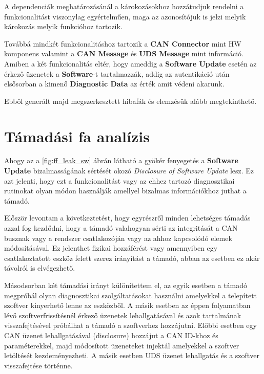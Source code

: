 A dependenciák meghatározásánál a károkozásokhoz hozzátudjuk rendelni a funkcionalitást viszonylag egyértelműen, maga az azonosítójuk is jelzi melyik károkozás melyik funkcióhoz tartozik.

Továbbá mindkét funkcionalitáshoz tartozik a \textbf{CAN Connector} mint HW komponens valamint a \textbf{CAN Message} és \textbf{UDS Message} mint információ. Amiben a két funkcionalitás eltér, hogy ameddig a \textbf{Software Update} esetén az érkező üzenetek a \textbf{Software}-t tartalmazzák, addig az autentikáció után elsősorban a kimenő \textbf{Diagnostic Data} az érték amit védeni akarunk.

Ebből generált majd megszerkesztett hibafák és elemzésük alább megtekinthető. \\

\section{Támadási fa analízis}

Ahogy az a \ref{fig:ff_leak_sw} ábrán látható a gyökér fenyegetés a \textbf{Software Update} bizalmasságának sértését okozó \textit{Disclosure of Software Update} lesz. Ez azt jelenti, hogy ezt a funkcionalitást vagy az ehhez tartozó diagnosztikai rutinokat olyan módon használják amellyel bizalmas információkhoz juthat a támadó.

Először levontam a következtetést, hogy egyrészről minden lehetséges támadás azzal fog kezdődni, hogy a támadó valahogyan sérti az integritását a CAN busznak vagy a rendszer csatlakozóján vagy az ahhoz kapcsolódó elemek módosításával. Ez jelenthet fizikai hozzáférést vagy amennyiben egy csatlakoztatott eszköz felett szerez irányítást a támadó, abban az esetben ez akár távolról is elvégezhető.

Másodsorban két támadási irányt különítettem el, az egyik esetben a támadó megpróbál olyan diagnosztikai szolgáltatásokat használni amelyekkel a telepített szoftver kinyerhető lenne az eszközből. A másik esetben az éppen folyamatban lévő szoftverfrissítésnél érkező üzenetek lehallgatásával és azok tartalmának visszafejtésével próbálhat a támadó a szoftverhez hozzájutni. Előbbi esetben egy CAN üzenet lehallgatásával (disclosure) hozzájut a CAN ID-khoz és paraméterekkel, majd módosított üzeneteket injektál amelyekkel a szoftver letöltését kezdeményezheti. A másik esetben UDS üzenet lehallgatás és a szoftver visszafejtése történne.

